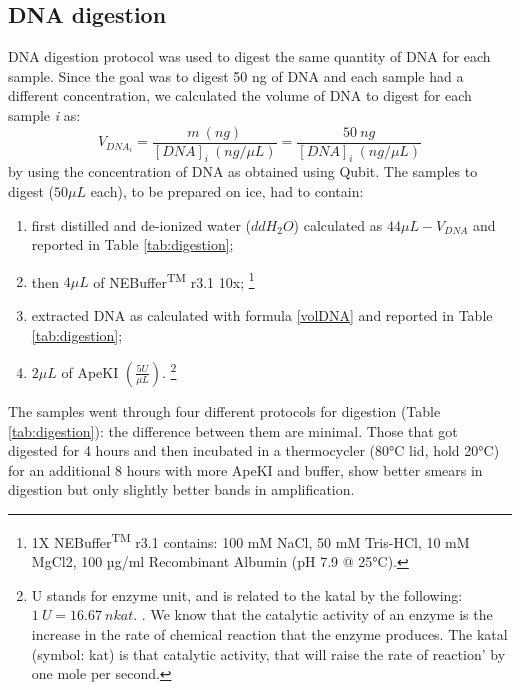 \documentclass[a4paper, 12pt]{report}
\begin{document}
\subsection{DNA digestion}
\vspace{-1em}
DNA digestion protocol was used to digest the same quantity of DNA for each sample. Since the goal was to digest 50 ng of DNA and each sample had a different concentration, we calculated the volume of DNA to digest for each sample \textit{i} as:
\begin{equation}\label{volDNA} 
	V_{DNA_i} = \frac{m \ (ng)}{[DNA]_{i} \ (ng / \mu L)}= \frac{50 \ ng}{[DNA]_{i} \ (ng/\mu L)}
\end{equation}
by using the concentration of DNA as obtained using Qubit. The samples to digest ($50 \mu L$ each), to be prepared on ice, had to contain:
\vspace{-1.5em}
\begin{enumerate}\setlength\itemsep{-0.2em}
	\item first distilled and de-ionized water ($ddH_2O$) calculated as $44 \mu L - V_{DNA}$ and reported in Table \ref{tab:digestion};
    \item then $4\mu L$ of NEBuffer\textsuperscript{TM} r3.1 10x; \footnote{1X NEBuffer\textsuperscript{TM} r3.1 contains: 100 mM NaCl, 50 mM Tris-HCl, 10 mM MgCl2, 100 µg/ml Recombinant Albumin (pH 7.9 @ 25°C).}
    \item extracted DNA as calculated with formula \ref{volDNA} and reported in Table \ref{tab:digestion};
    \item $2 \mu L$ of ApeKI $(\frac{5U}{\mu L})$. \footnote{U stands for enzyme unit, and is related to the katal by the following: $1 \ U = 16.67 \ nkat$. \parencite{nomenclaturecommitteeoftheinternationalunionofbiochemistrync-iubUnitsEnzymeActivity1979}. We know that the catalytic activity of an enzyme is the increase in the rate of chemical reaction that the enzyme produces. The katal (symbol: kat) is that catalytic activity, that will raise the rate of reaction’ by one mole per second.}
\end{enumerate}
\vspace{-1.5em}
The samples went through four different protocols for digestion (Table \ref{tab:digestion}): the difference between them are minimal. Those that got digested for 4 hours and then incubated in a thermocycler (80°C lid, hold 20°C) for an additional 8 hours with more ApeKI and buffer, show better smears in digestion but only slightly better bands in amplification.
\end{document}
